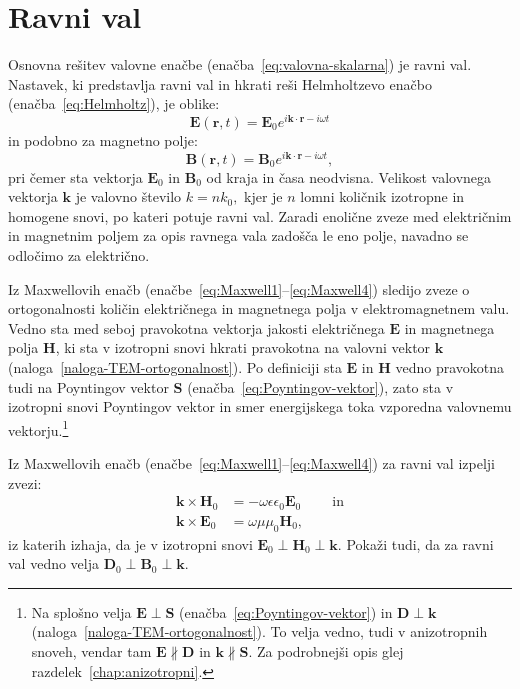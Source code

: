 \section{Ravni val}
Osnovna rešitev valovne enačbe (enačba~\ref{eq:valovna-skalarna}) je ravni 
val. Nastavek, ki predstavlja ravni val in hkrati reši 
Helmholtzevo enačbo (enačba~\ref{eq:Helmholtz}), je oblike:
\begin{equation}
\mathbf{E}(\mathbf{r},t) =
\mathbf{E}_{0}e^{i\mathbf{k}\cdot\mathbf{r}-i \omega t}
\end{equation}
in podobno za magnetno polje:
\begin{equation}
 \mathbf{B}(\mathbf{r},t) =
\mathbf{B}_{0}e^{i\mathbf{k}\cdot\mathbf{r}-i \omega t},
\end{equation}
pri čemer sta vektorja $\mathbf{E}_{0}$ in $\mathbf{B}_{0}$ od kraja in časa neodvisna. 
Velikost valovnega vektorja $\mathbf{k}$ je valovno število $k=nk_{0},$ 
kjer je $n$ lomni količnik izotropne in homogene snovi, po kateri potuje ravni val.
Zaradi enolične zveze med električnim in magnetnim poljem 
za opis ravnega vala zadošča le eno polje, navadno se odločimo za električno.

Iz Maxwellovih enačb (enačbe~\ref{eq:Maxwell1}--\ref{eq:Maxwell4}) sledijo zveze o ortogonalnosti
količin električnega in magnetnega polja v elektromagnetnem valu. Vedno sta med seboj pravokotna vektorja
jakosti električnega $\mathbf{E}$ in magnetnega polja $\mathbf{H}$, ki sta v izotropni snovi
hkrati pravokotna na valovni vektor $\mathbf{k}$ (naloga~\ref{naloga-TEM-ortogonalnost}).
Po definiciji sta $\mathbf{E}$ in $\mathbf{H}$ vedno pravokotna tudi na Poyntingov vektor $\mathbf{S}$ 
(enačba~\ref{eq:Poyntingov-vektor}), zato sta v izotropni snovi
Poyntingov vektor in smer energijskega toka vzporedna valovnemu vektorju.\footnote{Na splošno 
velja $\mathbf{E}\perp\mathbf{S}$ (enačba~\ref{eq:Poyntingov-vektor}) in 
$\mathbf{D}\perp\mathbf{k}$ (naloga~\ref{naloga-TEM-ortogonalnost}). 
To velja vedno, tudi v anizotropnih snoveh, vendar tam $\mathbf{E} \nparallel 
\mathbf{D}$ in $\mathbf k\nparallel\mathbf S$. Za podrobnejši opis glej 
razdelek~\ref{chap:anizotropni}.} 
\begin{naloga}
\label{naloga-TEM-ortogonalnost}
Iz Maxwellovih enačb (enačbe~\ref{eq:Maxwell1}--\ref{eq:Maxwell4}) za ravni val izpelji zvezi:
\begin{align}
\mathbf{k}\times\mathbf{H}_{0} & =-\omega\epsilon\epsilon_{0}\mathbf{E}_{0}\label{eq:TEM-pogoj1}\
\qquad \mathrm{in}\\
\mathbf{k}\times\mathbf{E}_{0} & =\omega\mu\mu_{0}\mathbf{H}_{0}\label{eq:TEM-pogoj2},
\end{align}
iz katerih izhaja, da je v izotropni snovi $\mathbf{E}_0\perp \mathbf{H}_0\perp 
\mathbf{k}$.
Pokaži tudi, da za ravni val vedno velja $\mathbf{D}_0 \perp \mathbf{B}_0 \perp \mathbf{k}$.
\end{naloga}


